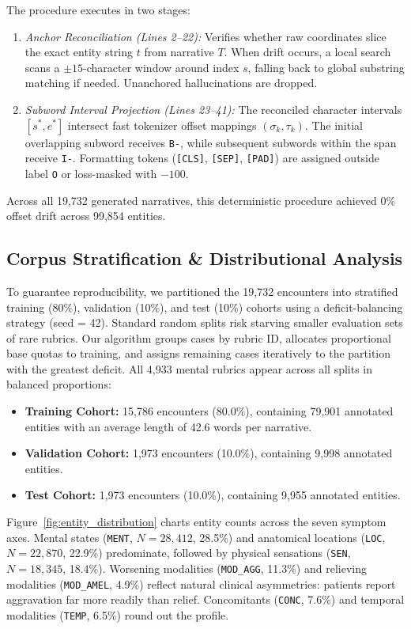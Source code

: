 The procedure executes in two stages:
\begin{enumerate}
    \item \textit{Anchor Reconciliation (Lines 2--22):} Verifies whether raw coordinates slice the exact entity string $t$ from narrative $T$. When drift occurs, a local search scans a $\pm 15$-character window around index $s$, falling back to global substring matching if needed. Unanchored hallucinations are dropped.
    \item \textit{Subword Interval Projection (Lines 23--41):} The reconciled character intervals $[s^*, e^*]$ intersect fast tokenizer offset mappings $(\sigma_k, \tau_k)$. The initial overlapping subword receives \texttt{B-}, while subsequent subwords within the span receive \texttt{I-}. Formatting tokens (\texttt{[CLS]}, \texttt{[SEP]}, \texttt{[PAD]}) are assigned outside label \texttt{O} or loss-masked with $-100$.
\end{enumerate}

Across all 19,732 generated narratives, this deterministic procedure achieved $0$\% offset drift across 99,854 entities.

\subsection{Corpus Stratification \& Distributional Analysis}

To guarantee reproducibility, we partitioned the 19,732 encounters into stratified training (80\%), validation (10\%), and test (10\%) cohorts using a deficit-balancing strategy (seed = 42). Standard random splits risk starving smaller evaluation sets of rare rubrics. Our algorithm groups cases by rubric ID, allocates proportional base quotas to training, and assigns remaining cases iteratively to the partition with the greatest deficit. All 4,933 mental rubrics appear across all splits in balanced proportions:
\begin{itemize}
    \item \textbf{Training Cohort:} 15,786 encounters (80.0\%), containing 79,901 annotated entities with an average length of 42.6 words per narrative.
    \item \textbf{Validation Cohort:} 1,973 encounters (10.0\%), containing 9,998 annotated entities.
    \item \textbf{Test Cohort:} 1,973 encounters (10.0\%), containing 9,955 annotated entities.
\end{itemize}

Figure~\ref{fig:entity_distribution} charts entity counts across the seven symptom axes. Mental states (\texttt{MENT}, $N = 28,412$, 28.5\%) and anatomical locations (\texttt{LOC}, $N = 22,870$, 22.9\%) predominate, followed by physical sensations (\texttt{SEN}, $N = 18,345$, 18.4\%). Worsening modalities (\texttt{MOD\_AGG}, 11.3\%) and relieving modalities (\texttt{MOD\_AMEL}, 4.9\%) reflect natural clinical asymmetries: patients report aggravation far more readily than relief. Concomitants (\texttt{CONC}, 7.6\%) and temporal modalities (\texttt{TEMP}, 6.5\%) round out the profile.
